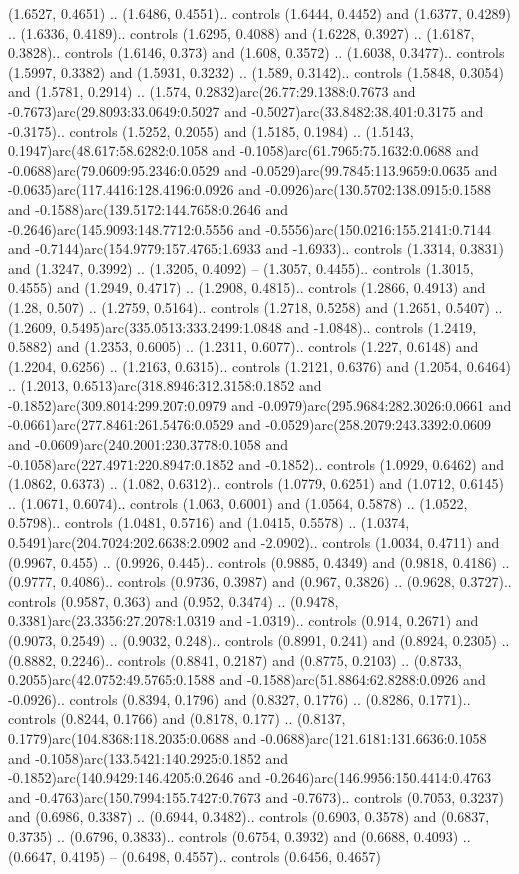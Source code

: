 (1.6527, 0.4651) .. (1.6486, 0.4551).. controls (1.6444, 0.4452) and (1.6377, 0.4289) .. (1.6336, 0.4189).. controls (1.6295, 0.4088) and (1.6228, 0.3927) .. (1.6187, 0.3828).. controls (1.6146, 0.373) and (1.608, 0.3572) .. (1.6038, 0.3477).. controls (1.5997, 0.3382) and (1.5931, 0.3232) .. (1.589, 0.3142).. controls (1.5848, 0.3054) and (1.5781, 0.2914) .. (1.574, 0.2832)arc(26.77:29.1388:0.7673 and -0.7673)arc(29.8093:33.0649:0.5027 and -0.5027)arc(33.8482:38.401:0.3175 and -0.3175).. controls (1.5252, 0.2055) and (1.5185, 0.1984) .. (1.5143, 0.1947)arc(48.617:58.6282:0.1058 and -0.1058)arc(61.7965:75.1632:0.0688 and -0.0688)arc(79.0609:95.2346:0.0529 and -0.0529)arc(99.7845:113.9659:0.0635 and -0.0635)arc(117.4416:128.4196:0.0926 and -0.0926)arc(130.5702:138.0915:0.1588 and -0.1588)arc(139.5172:144.7658:0.2646 and -0.2646)arc(145.9093:148.7712:0.5556 and -0.5556)arc(150.0216:155.2141:0.7144 and -0.7144)arc(154.9779:157.4765:1.6933 and -1.6933).. controls (1.3314, 0.3831) and (1.3247, 0.3992) .. (1.3205, 0.4092) -- (1.3057, 0.4455).. controls (1.3015, 0.4555) and (1.2949, 0.4717) .. (1.2908, 0.4815).. controls (1.2866, 0.4913) and (1.28, 0.507) .. (1.2759, 0.5164).. controls (1.2718, 0.5258) and (1.2651, 0.5407) .. (1.2609, 0.5495)arc(335.0513:333.2499:1.0848 and -1.0848).. controls (1.2419, 0.5882) and (1.2353, 0.6005) .. (1.2311, 0.6077).. controls (1.227, 0.6148) and (1.2204, 0.6256) .. (1.2163, 0.6315).. controls (1.2121, 0.6376) and (1.2054, 0.6464) .. (1.2013, 0.6513)arc(318.8946:312.3158:0.1852 and -0.1852)arc(309.8014:299.207:0.0979 and -0.0979)arc(295.9684:282.3026:0.0661 and -0.0661)arc(277.8461:261.5476:0.0529 and -0.0529)arc(258.2079:243.3392:0.0609 and -0.0609)arc(240.2001:230.3778:0.1058 and -0.1058)arc(227.4971:220.8947:0.1852 and -0.1852).. controls (1.0929, 0.6462) and (1.0862, 0.6373) .. (1.082, 0.6312).. controls (1.0779, 0.6251) and (1.0712, 0.6145) .. (1.0671, 0.6074).. controls (1.063, 0.6001) and (1.0564, 0.5878) .. (1.0522, 0.5798).. controls (1.0481, 0.5716) and (1.0415, 0.5578) .. (1.0374, 0.5491)arc(204.7024:202.6638:2.0902 and -2.0902).. controls (1.0034, 0.4711) and (0.9967, 0.455) .. (0.9926, 0.445).. controls (0.9885, 0.4349) and (0.9818, 0.4186) .. (0.9777, 0.4086).. controls (0.9736, 0.3987) and (0.967, 0.3826) .. (0.9628, 0.3727).. controls (0.9587, 0.363) and (0.952, 0.3474) .. (0.9478, 0.3381)arc(23.3356:27.2078:1.0319 and -1.0319).. controls (0.914, 0.2671) and (0.9073, 0.2549) .. (0.9032, 0.248).. controls (0.8991, 0.241) and (0.8924, 0.2305) .. (0.8882, 0.2246).. controls (0.8841, 0.2187) and (0.8775, 0.2103) .. (0.8733, 0.2055)arc(42.0752:49.5765:0.1588 and -0.1588)arc(51.8864:62.8288:0.0926 and -0.0926).. controls (0.8394, 0.1796) and (0.8327, 0.1776) .. (0.8286, 0.1771).. controls (0.8244, 0.1766) and (0.8178, 0.177) .. (0.8137, 0.1779)arc(104.8368:118.2035:0.0688 and -0.0688)arc(121.6181:131.6636:0.1058 and -0.1058)arc(133.5421:140.2925:0.1852 and -0.1852)arc(140.9429:146.4205:0.2646 and -0.2646)arc(146.9956:150.4414:0.4763 and -0.4763)arc(150.7994:155.7427:0.7673 and -0.7673).. controls (0.7053, 0.3237) and (0.6986, 0.3387) .. (0.6944, 0.3482).. controls (0.6903, 0.3578) and (0.6837, 0.3735) .. (0.6796, 0.3833).. controls (0.6754, 0.3932) and (0.6688, 0.4093) .. (0.6647, 0.4195) -- (0.6498, 0.4557).. controls (0.6456, 0.4657) 
